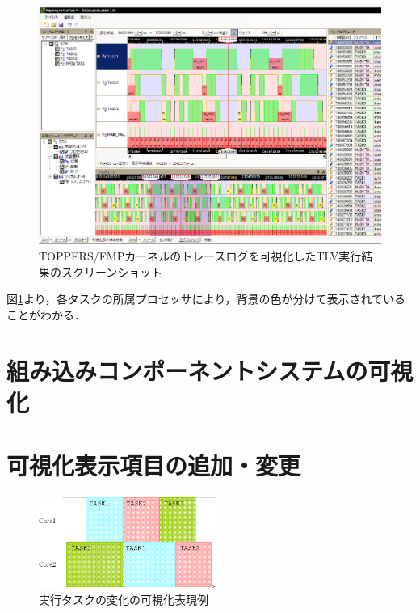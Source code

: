 \begin{figure}[t]
\begin{center}
\includegraphics[width=15cm]{img/fmpTLVscreenShot.eps}
\caption{TOPPERS/FMPカーネルのトレースログを可視化したTLV実行結果のスクリーンショット}
\label{fig:fmpTLVscreenShot}
\end{center}
\end{figure}

図\ref{fig:fmpTLVscreenShot}より，各タスクの所属プロセッサにより，背景の色が分けて表示されていることがわかる．

\section{組み込みコンポーネントシステムの可視化}



\section{可視化表示項目の追加・変更}

\begin{figure}[t]
\begin{center}
\includegraphics[height=3cm]{img/runningTaskChangeVisual.eps}
\caption{実行タスクの変化の可視化表現例}
\label{fig:runningTaskChangeVisual}
\end{center}
\end{figure}

